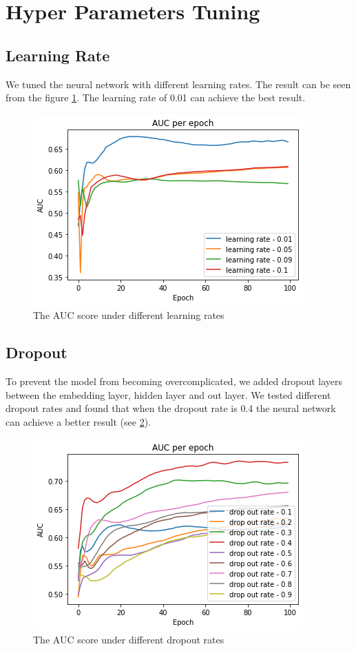 \documentclass[11pt,twoside]{report}
\begin{document}
\section{Hyper Parameters Tuning}
\subsection{Learning Rate}
We tuned the neural network with different learning rates. The result can be seen from the figure \ref{fig:auc_learning_rate}. The learning rate of 0.01 can achieve the best result.

\begin{figure}[H]
    \centering
    \includegraphics[scale=0.9]{auc_learning_rate.png}
    \caption{The AUC score under different learning rates}
    \label{fig:auc_learning_rate}
\end{figure}

\subsection{Dropout}
To prevent the model from becoming overcomplicated, we added dropout layers between the embedding layer, hidden layer and out layer. We tested different dropout rates and found that when the dropout rate is 0.4 the neural network can achieve a better result (see \ref{fig:auc_drop_out_rate}).

\begin{figure}[H]
    \centering
    \includegraphics[scale=0.9]{auc_drop_out_rate.png}
    \caption{The AUC score under different dropout rates}
    \label{fig:auc_drop_out_rate}
\end{figure}
\end{document}
